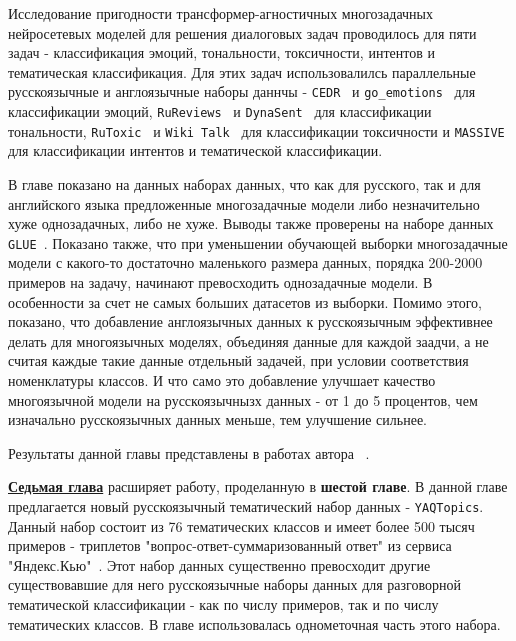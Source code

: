 Исследование пригодности трансформер-агностичных многозадачных нейросетевых моделей для решения диалоговых задач проводилось для пяти задач - классификация эмоций, тональности, токсичности, интентов и тематическая классификация. Для этих задач использовалилсь параллельные русскоязычные и англоязычные наборы даннчы - \texttt{CEDR}~\cite{cedr} и \texttt{go_emotions}~\cite{go_emotions} для классификации эмоций, \texttt{RuReviews}~\cite{rureviews} и \texttt{DynaSent}~\cite{dynasent} для классификации тональности, \texttt{RuToxic}~\cite{rutoxic} и \texttt{Wiki Talk}~\cite{wikitalk} для классификации токсичности и \texttt{MASSIVE}~\cite{massive} для классификации интентов и тематической классификации.

В главе показано на данных наборах данных, что как для русского, так и для английского языка предложенные многозадачные модели либо незначительно хуже однозадачных, либо не хуже. Выводы также проверены на наборе данных \texttt{GLUE}~\cite{glue}. Показано также, что при уменьшении обучающей выборки многозадачные модели с какого-то достаточно маленького размера данных, порядка 200-2000 примеров на задачу, начинают превосходить однозадачные модели. В особенности за счет не самых больших датасетов из выборки. Помимо этого, показано, что добавление англоязычных данных к русскоязычным эффективнее делать для многоязычных моделях, объединяя данные для каждой заадчи, а не считая каждые такие данные отдельный задачей, при условии соответствия номенклатуры классов. И что само это добавление улучшает качество многоязычной модели на русскоязычнызх данных - от 1 до 5 процентов, чем изначально русскоязычных данных меньше, тем улучшение сильнее.


Результаты данной главы представлены в работах автора ~\cite{rumtl,enmtl}.

\underline{\textbf{Седьмая глава}} расширяет работу, проделанную в \textbf{шестой главе}. В данной главе предлагается новый русскоязычный тематический набор данных - \texttt{YAQTopics}.  Данный набор состоит из 76 тематических классов и имеет более 500 тысяч примеров - триплетов "вопрос-ответ-суммаризованный ответ" из сервиса "Яндекс.Кью"~\cite{yandex_q}. Этот набор данных существенно превосходит другие существовавшие для него русскоязычные наборы данных для разговорной тематической классификации - как по числу примеров, так и по числу тематических классов. В главе использовалась однометочная часть этого набора. 

